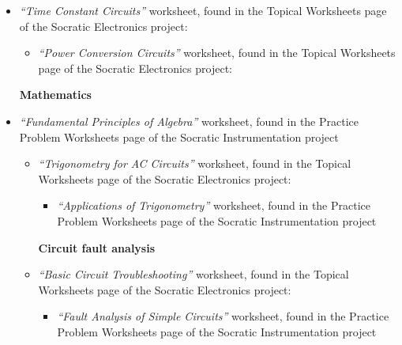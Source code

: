 \begin{itemize}
\begin{itemize}
\begin{itemize}
\begin{itemize}
\vskip 5pt
\item{} {\it ``Time Constant Circuits''} worksheet, found in the Topical Worksheets page of the Socratic Electronics project:
\begin{itemize}

\vskip 5pt
\item{} {\it ``Power Conversion Circuits''} worksheet, found in the Topical Worksheets page of the Socratic Electronics project:
\begin{itemize}

\end{itemize}
\end{itemize}




\vskip 20pt

\noindent
{\bf Mathematics}

\item{} {\it ``Fundamental Principles of Algebra''} worksheet, found in the Practice Problem Worksheets page of the Socratic Instrumentation project
\begin{itemize}

\vskip 5pt
\item{} {\it ``Trigonometry for AC Circuits''} worksheet, found in the Topical Worksheets page of the Socratic Electronics project:
\begin{itemize}

\vskip 5pt
\item{} {\it ``Applications of Trigonometry''} worksheet, found in the Practice Problem Worksheets page of the Socratic Instrumentation project
\begin{itemize}

\end{itemize}
\end{itemize}




\vskip 20pt

\noindent
{\bf Circuit fault analysis}

\item{} {\it ``Basic Circuit Troubleshooting''} worksheet, found in the Topical Worksheets page of the Socratic Electronics project:
\begin{itemize}

\vskip 5pt
\item{} {\it ``Fault Analysis of Simple Circuits''} worksheet, found in the Practice Problem Worksheets page of the Socratic Instrumentation project
\begin{itemize}


\end{itemize}
\end{itemize}
\end{itemize}
\end{itemize}
\end{itemize}
\end{itemize}
\end{itemize}

